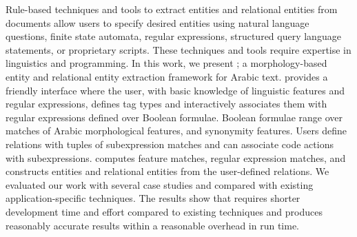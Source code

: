 Rule-based techniques and tools to extract entities and relational entities from documents allow users to specify desired entities using natural language questions, finite state automata, regular expressions, structured query language statements, or proprietary scripts.
These techniques and tools require expertise in linguistics and programming.
In this work, we present \framework; a morphology-based entity and relational entity extraction framework for Arabic text.
\framework provides a friendly interface where the user, with basic knowledge of linguistic features and regular expressions, defines tag types and interactively associates them with regular expressions defined over Boolean formulae.
Boolean formulae range over matches of Arabic morphological features, and synonymity features.
Users define relations with tuples of subexpression matches and can associate code actions with subexpressions.
\framework computes feature matches, regular expression matches, and constructs entities and relational entities from the user-defined relations.
We evaluated our work with several case studies and compared with existing application-specific techniques.
The results show that \framework requires shorter development time and effort compared to existing techniques and produces reasonably accurate results within a reasonable overhead in run time.
